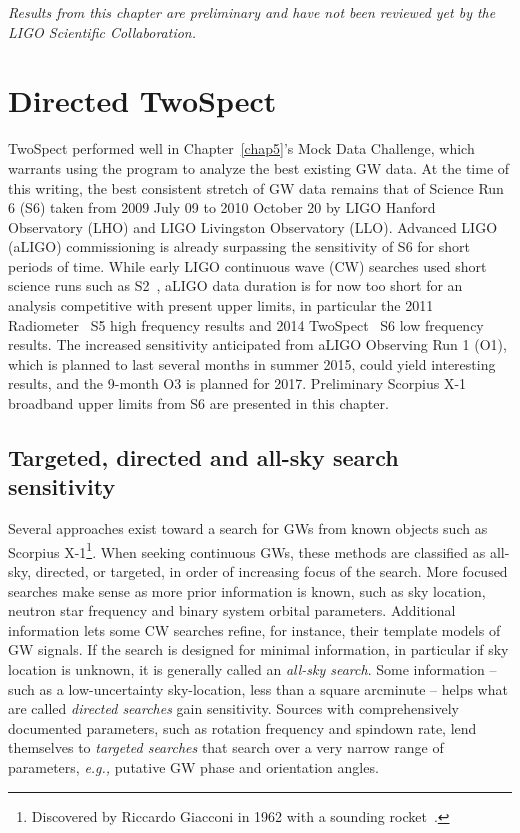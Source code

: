 
\textit{Results from this chapter are preliminary and have not been reviewed yet by the LIGO Scientific Collaboration.}

        \section{Directed TwoSpect}
        \label{directed}

TwoSpect performed well in Chapter~\ref{chap5}'s Mock Data Challenge, which warrants using the program to analyze the best existing GW data.
At the time of this writing, the best consistent stretch of GW data remains that of Science Run 6 (S6) taken from 2009 July 09 to 2010 October 20 by LIGO Hanford Observatory (LHO) and LIGO Livingston Observatory (LLO).
Advanced LIGO (aLIGO) commissioning is already surpassing the sensitivity of S6 for short periods of time.
While early LIGO continuous wave (CW) searches used short science runs such as S2~\cite{AbbottScoX12007}, aLIGO data duration is for now too short for an analysis competitive with present upper limits, in particular the 2011 Radiometer~\cite{AbadieStoch2011} S5 high frequency results and 2014 TwoSpect~\cite{GoetzTwoSpectResults2014} S6 low frequency results.
The increased sensitivity anticipated from aLIGO Observing Run 1 (O1), which is planned to last several months in summer 2015, could yield interesting results, and the 9-month O3 is planned for 2017.
Preliminary Scorpius X-1 broadband upper limits from S6 are presented in this chapter.


            \subsection{Targeted, directed and all-sky search sensitivity}
            \label{tradeoffs}

Several approaches exist toward a search for GWs from known objects such as Scorpius X-1\footnote{Discovered by Riccardo Giacconi in 1962 with a sounding rocket~\cite{Giacconi1962}.}.
When seeking continuous GWs, these methods are classified as all-sky, directed, or targeted, in order of increasing focus of the search.
More focused searches make sense as more prior information is known, such as sky location, neutron star frequency and binary system orbital parameters.
Additional information lets some CW searches refine, for instance, their template models of GW signals.
If the search is designed for minimal information, in particular if sky location is unknown, it is generally called an \textit{all-sky search}.
Some information -- such as a low-uncertainty sky-location, less than a square arcminute -- helps what are called \textit{directed searches} gain sensitivity.
Sources with comprehensively documented parameters, such as rotation frequency and spindown rate, lend themselves to \textit{targeted searches} that search over a very narrow range of parameters, \textit{e.g.,} putative GW phase and orientation angles.

